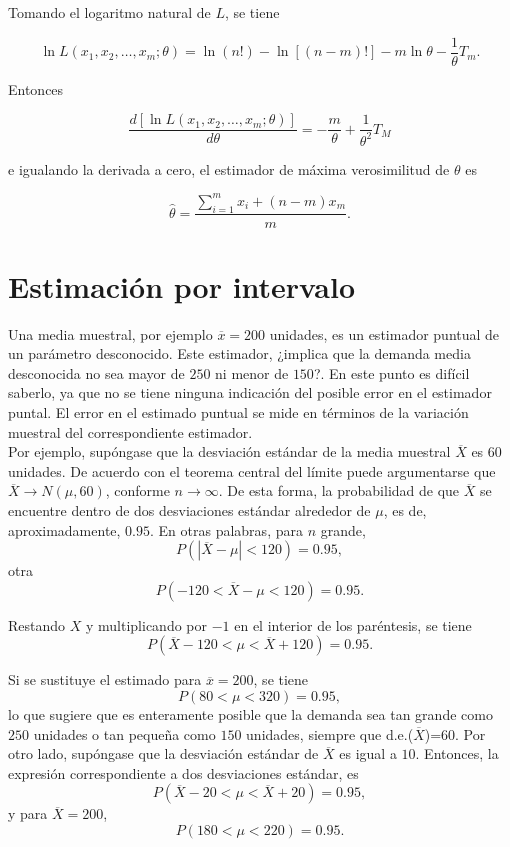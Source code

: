 Tomando el logaritmo natural de $L$, se tiene

$$\ln L(x_1,x_2,\ldots,x_m; \theta) = \ln(n!)-\ln\left[(n-m)!\right]-m\ln\theta -\dfrac{1}{\theta}T_m.$$

Entonces

$$\dfrac{d\left[\ln L(x_1,x_2,\ldots,x_m; \theta)\right]}{d\theta}=-\dfrac{m}{\theta}+\dfrac{1}{\theta^2}T_M$$

e igualando la derivada a cero, el estimador de máxima verosimilitud de $\theta$ es

$$\hat{\theta}=\dfrac{\displaystyle\sum_{i=1}^m x_i+(n-m)x_m}{m}.$$


\section{Estimación por intervalo}
Una media muestral, por ejemplo $\overline{x}=200$ unidades, es un estimador puntual de un parámetro desconocido. Este estimador, ¿implica que la demanda media desconocida no sea mayor de $250$ ni menor de $150$?. En este punto es difícil saberlo, ya que no se tiene ninguna indicación del posible error en el estimador puntal. El error en el estimado puntual se mide en términos de la variación muestral del correspondiente estimador.\\

Por ejemplo, supóngase que la desviación estándar de la media muestral $\overline{X}$ es $60$ unidades. De acuerdo con el teorema central del límite puede argumentarse que $\overline{X}\to N(\mu,60)$, conforme $n\to \infty$. De esta forma, la probabilidad de que $\overline{X}$ se encuentre dentro de dos desviaciones estándar alrededor de $\mu$, es de, aproximadamente, $0.95$. En otras palabras, para $n$ grande,
$$P(|\overline{X}-\mu|<120)=0.95,$$
otra
$$P(-120<\overline{X}-\mu<120)=0.95.$$

Restando $X$ y multiplicando por $-1$ en el interior de los paréntesis, se tiene
$$P(\overline{X}-120<\mu<\overline{X}+120)=0.95.$$

Si se sustituye el estimado para $\overline{x}=200$, se tiene
$$P(80<\mu<320)=0.95,$$
lo que sugiere que es enteramente posible que la demanda sea tan grande como $250$ unidades o tan pequeña como $150$ unidades, siempre que d.e.($\overline{X}$)=60. Por otro lado, supóngase que la desviación estándar de $\overline{X}$ es igual a $10$. Entonces, la expresión correspondiente a dos desviaciones estándar, es
$$P(\overline{X}-20<\mu<\overline{X}+20)=0.95,$$
y para $\overline{X}=200$, 
$$P(180<\mu<220)=0.95.$$

